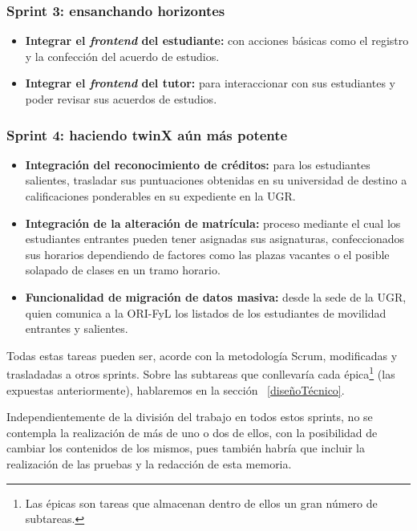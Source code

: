 \subsubsection*{\textbf{Sprint 3: ensanchando horizontes}}

\begin{itemize}
	\item \textbf{Integrar el \textit{frontend} del estudiante:} con acciones básicas como el registro y la confección del acuerdo de estudios.
	\item \textbf{Integrar el \textit{frontend} del tutor:} para interaccionar con sus estudiantes y poder revisar sus acuerdos de estudios.
\end{itemize}

\subsubsection*{\textbf{Sprint 4: haciendo twinX aún más potente}}

\begin{itemize}
	\item \textbf{Integración del reconocimiento de créditos:} para los estudiantes salientes, trasladar sus puntuaciones obtenidas en su universidad de destino a calificaciones ponderables en su expediente en la UGR.
	\item \textbf{Integración de la alteración de matrícula:} proceso mediante el cual los estudiantes entrantes pueden tener asignadas sus asignaturas, confeccionados sus horarios dependiendo de factores como las plazas vacantes o el posible solapado de clases en un tramo horario.
	\item \textbf{Funcionalidad de migración de datos masiva:} desde la sede de la UGR, quien comunica a la ORI-FyL los listados de los estudiantes de movilidad entrantes y salientes.
\end{itemize}

Todas estas tareas pueden ser, acorde con la metodología Scrum, modificadas y trasladadas a otros sprints. Sobre las subtareas que conllevaría cada épica\footnote{Las épicas son tareas que almacenan dentro de ellos un gran número de subtareas.} (las expuestas anteriormente), hablaremos en la sección ~\ref{diseñoTécnico}. %

Independientemente de la división del trabajo en todos estos sprints, no se contempla la realización de más de uno o dos de ellos, con la posibilidad de cambiar los contenidos de los mismos, pues también habría que incluir la realización de las pruebas y la redacción de esta memoria.

